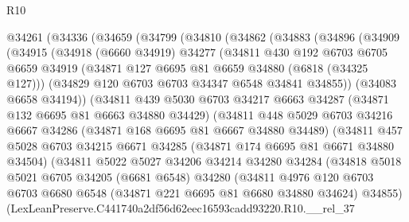 \begin{lexlean}{R10}
\begin{coremodule}
  @34261
    (@34336
      (@34659
        (@34799
          (@34810
            (@34862
              (@34883
                (@34896
                  (@34909
                    (@34915
                      (@34918
                        (@6660 @34919)
                        @34277
                        (@34811
                          @430
                          @192
                          @6703
                          @6705
                          @6659
                          @34919
                          (@34871 @127 @6695 @81 @6659 @34880 (@6818 (@34325 @127)))
                          (@34829 @120 @6703 @6703 @34347 @6548 @34841 @34855))
                        (@34083 @6658 @34194))
                      (@34811
                        @439
                        @5030
                        @6703
                        @34217
                        @6663
                        @34287
                        (@34871 @132 @6695 @81 @6663 @34880 @34429)
                        (@34811
                          @448
                          @5029
                          @6703
                          @34216
                          @6667
                          @34286
                          (@34871 @168 @6695 @81 @6667 @34880 @34489)
                          (@34811
                            @457
                            @5028
                            @6703
                            @34215
                            @6671
                            @34285
                            (@34871 @174 @6695 @81 @6671 @34880 @34504)
                            (@34811
                              @5022
                              @5027
                              @34206
                              @34214
                              @34280
                              @34284
                              (@34818
                                @5018
                                @5021
                                @6705
                                @34205
                                (@6681 @6548)
                                @34280
                                (@34811
                                  @4976
                                  @120
                                  @6703
                                  @6703
                                  @6680
                                  @6548
                                  (@34871 @221 @6695 @81 @6680 @34880 @34624)
                                  @34855)
                                (LexLeanPreserve.C441740a2df56d62eec16593cadd93220.R10.__rel_37

\end{coremodule}
\end{lexlean}
